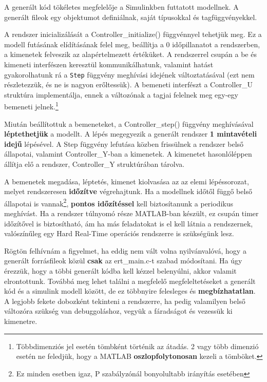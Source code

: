A generált kód tökéletes megfelelője a Simulinkben futtatott modellnek. A generált fileok egy objektumot definiálnak, saját típusokkal és tagfüggvényekkel.

A rendszer inicializálását a Controller\_initialize() függvénnyel tehetjük meg. Ez a modell futásának elídításának felel meg, beállítja a 0 időpillanatot a rendszerben, a kimenetek felveszik az alapértelmezett értéküket.
A rendszerrel csupán a be és kimeneti interfészen keresztül kommunikálhatunk, valamint hatást gyakorolhatunk rá a \verb!Step! függvény meghívási idejének változtatásával (ezt nem részletezzük, és ne is nagyon erőltessük).
A bemeneti interfészt a Controller\_U struktúra implementálja, ennek a változónak a tagjai felelnek meg egy-egy bemeneti jelnek.\footnote{Többdimenziós jel esetén tömbként történik az átadás. 2 vagy több dimenzió esetén ne feledjük, hogy a MATLAB \textbf{oszlopfolytonosan} kezeli a tömböket.}

Miután beállítottuk a bemeneteket, a Controller\_step() függvény meghívásával \textbf{léptethetjük} a modellt. A lépés megegyezik a generált rendszer \textbf{1 mintavételi idejű} lépésével. A Step függvény lefutása közben frissülnek a rendszer belső állapotai, valamint Controller\_Y-ban a kimenetek. A kimenetet hasonlóléppen állítja elő a rendszer, Controller\_Y struktúrában tárolva.

A bemenetek megadása, léptetés, kimenet kiolvasása az az elemi lépéssorozat, melyet rendszeresen \textbf{időzítve} végrehajtunk. Ha a modellnek időtől függő belső állapotai is vannak\footnote{Ez minden esetben igaz, P szabályzónál bonyolultabb irányítás esetében}, \textbf{pontos időzítéssel} kell biztosítanunk a periodikus meghívást. Ha a rendszer túlnyomó része MATLAB-ban készült, ez csupán timer időzítővel is biztosítható, ám ha más feladatokat is el kell látnia a rendszernek, valószínűleg egy Hard Real-Time operációs rendszerre is szükségünk lesz.

Rögtön felhívnám a figyelmet, ha eddig nem vált volna nyilvánvalóvá, hogy a generált forrásfileok közül \textbf{csak} az ert\_main.c-t szabad módosítani. Ha úgy érezzük, hogy a többi generált kódba kell kézzel belenyúlni, akkor valamit elrontottunk. Továbbá meg lehet találni a megfelelő megfeleltetéseket a generált kód és a simulink modell között, de ez többnyire felesleges és \textbf{megbízhatatlan}. A legjobb fekete dobozként tekinteni a rendszerre, ha pedig valamilyen belső változóra szükség van debuggoláshoz, vegyük a fáradságot és vezessük ki kimenetre.

